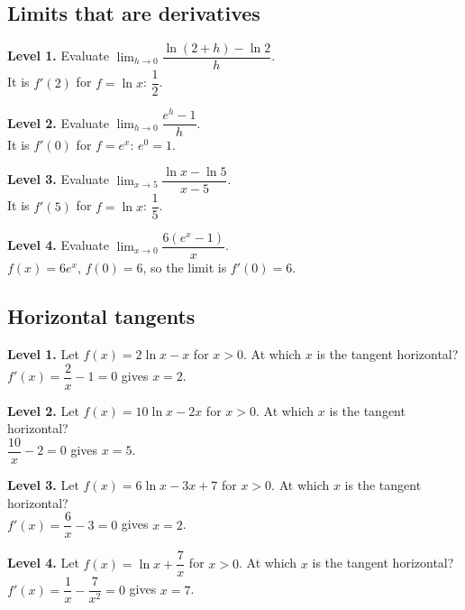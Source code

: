 \documentclass[11pt]{article}
\begin{document}
\subsection*{Limits that are derivatives}
\noindent\textbf{Level 1.} Evaluate $\displaystyle\lim_{h\to0}\dfrac{\ln(2+h)-\ln 2}{h}$.\\  \quad It is $f'(2)$ for $f=\ln x$: $\dfrac{1}{2}$.\par\medskip
\noindent\textbf{Level 2.} Evaluate $\displaystyle\lim_{h\to0}\dfrac{e^{h}-1}{h}$.\\  \quad It is $f'(0)$ for $f=e^{x}$: $e^{0}=1$.\par\medskip
\noindent\textbf{Level 3.} Evaluate $\displaystyle\lim_{x\to5}\dfrac{\ln x-\ln 5}{x-5}$.\\  \quad It is $f'(5)$ for $f=\ln x$: $\dfrac{1}{5}$.\par\medskip
\noindent\textbf{Level 4.} Evaluate $\displaystyle\lim_{x\to0}\dfrac{6(e^{x}-1)}{x}$.\\  \quad $f(x)=6e^{x}$, $f(0)=6$, so the limit is $f'(0)=6$.\par\medskip
\subsection*{Horizontal tangents}
\noindent\textbf{Level 1.} Let $f(x)=2\ln x-x$ for $x>0$. At which $x$ is the tangent horizontal?\\  \quad $f'(x)=\dfrac{2}{x}-1=0$ gives $x=2$.\par\medskip
\noindent\textbf{Level 2.} Let $f(x)=10\ln x-2x$ for $x>0$. At which $x$ is the tangent horizontal?\\  \quad $\dfrac{10}{x}-2=0$ gives $x=5$.\par\medskip
\noindent\textbf{Level 3.} Let $f(x)=6\ln x-3x+7$ for $x>0$. At which $x$ is the tangent horizontal?\\  \quad $f'(x)=\dfrac{6}{x}-3=0$ gives $x=2$.\par\medskip
\noindent\textbf{Level 4.} Let $f(x)=\ln x+\dfrac{7}{x}$ for $x>0$. At which $x$ is the tangent horizontal?\\  \quad $f'(x)=\dfrac{1}{x}-\dfrac{7}{x^{2}}=0$ gives $x=7$.\par\medskip
\end{document}
